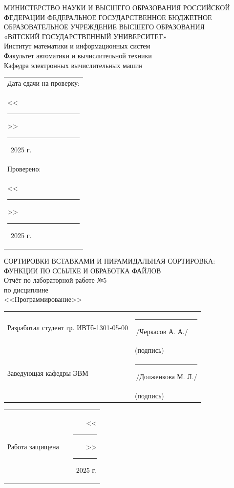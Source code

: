 \documentclass[oneside,a4paper,14pt]{extarticle}
\begin{document}
\newpage
\thispagestyle{empty}
\begin{center}
	МИНИСТЕРСТВО НАУКИ И ВЫСШЕГО ОБРАЗОВАНИЯ РОССИЙСКОЙ ФЕДЕРАЦИИ ФЕДЕРАЛЬНОЕ ГОСУДАРСТВЕННОЕ БЮДЖЕТНОЕ ОБРАЗОВАТЕЛЬНОЕ УЧРЕЖДЕНИЕ ВЫСШЕГО ОБРАЗОВАНИЯ\\
	«ВЯТСКИЙ ГОСУДАРСТВЕННЫЙ УНИВЕРСИТЕТ»\\
	Институт математики и информационных систем\\
	Факультет автоматики и вычислительной техники\\
	Кафедра электронных вычислительных машин
\end{center}
\vspace{10mm}

\hfill
\begin{tabular}{l}
  \footnotesize Дата сдачи на проверку: \\
  \footnotesize <<\rule[-1mm]{5mm}{0.10mm}\/>>\rule[-1mm]{20mm}{0.10mm}\ 2025 г.\\
  \footnotesize Проверено: \\
  \footnotesize <<\rule[-1mm]{5mm}{0.10mm}\/>>\rule[-1mm]{20mm}{0.10mm}\ 2025 г. \\
\end{tabular}
\vfill

\begin{center}
    СОРТИРОВКИ ВСТАВКАМИ И ПИРАМИДАЛЬНАЯ СОРТИРОВКА: ФУНКЦИИ ПО ССЫЛКЕ И ОБРАБОТКА ФАЙЛОВ\\
	Отчёт по лабораторной работе №5\\
	по дисциплине\\
	<<Программирование>>\\
\end{center}
\vspace{25mm}
\noindent
\begin{tabular}{ll}
	Разработал студент гр. ИВТб-1301-05-00 & \rule[-1mm]{30mm}{0.10mm}\,/Черкасов А. А./   \\
	                                       & \hspace{8mm}\footnotesize(подпись)            \\
	Заведующая кафедры ЭВМ                & \rule[-1mm]{30mm}{0.10mm}\,/Долженкова М. Л./ \\
	                                       & \hspace{8mm}\footnotesize(подпись)            \\
\end{tabular}

\noindent
  \begin{tabular}{lp{58mm}r}
    Работа защищена &  & <<\rule[-1mm]{5mm}{0.10mm}\/>>\rule[-1mm]{30mm}{0.10mm}\ 2025 г.
  \end{tabular}
  \vfill
\end{document}
